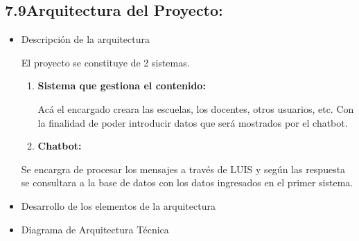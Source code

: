 \documentclass[12pt]{report}
\begin{document}
\subsection*{7.9\hspace*{10pt}Arquitectura del Proyecto:}
\begin{itemize}
	\item Descripción de la arquitectura\par

El proyecto se constituye de 2 sistemas.\par

\begin{enumerate}
	\item \textbf{Sistema que gestiona el contenido:}\par

Acá el encargado creara las escuelas, los docentes, otros usuarios, etc. Con la finalidad de poder introducir datos que será mostrados por el chatbot.\par

	\item \textbf{Chatbot:}
\end{enumerate}\par

Se encargra de procesar los mensajes a través de LUIS y según las respuesta se consultara a la base de datos con los datos ingresados en el primer sistema.\par

	\item Desarrollo de los elementos de la arquitectura\par


\vspace{\baselineskip}
\vspace{\baselineskip}

\vspace{\baselineskip}
	\item Diagrama de Arquitectura Técnica
\end{itemize}\par

\par 
\end{document}
